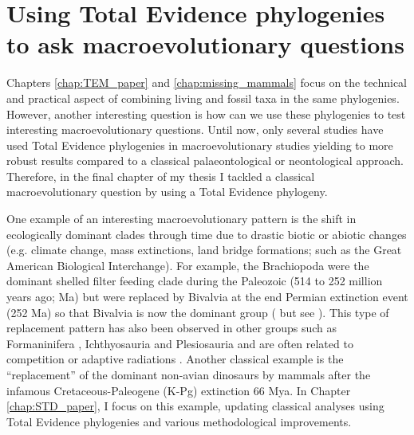 \section{Using Total Evidence phylogenies to ask macroevolutionary questions}
Chapters \ref{chap:TEM_paper} and \ref{chap:missing_mammals} focus on the technical and practical aspect of combining living and fossil taxa in the same phylogenies.
However, another interesting question is how can we use these phylogenies to test interesting macroevolutionary questions.
Until now, only several studies have used Total Evidence phylogenies in macroevolutionary studies \citep[e.g.][]{Wood01032013,slaterphylogenetic2013,beckancient2014,Dembo2015} %
yielding to more robust results compared to a classical palaeontological or neontological approach.
Therefore, in the final chapter of my thesis I tackled a classical macroevolutionary question by using a Total Evidence phylogeny. 

One example of an interesting macroevolutionary pattern is the shift in ecologically dominant clades through time due to drastic biotic or abiotic changes (e.g. climate change, mass extinctions, land bridge formations; such as the Great American Biological Interchange). %
For example, the Brachiopoda were the dominant shelled filter feeding clade during the Paleozoic (514 to 252 million years ago; Ma) but were replaced by Bivalvia at the end Permian extinction event (252 Ma) so that Bivalvia is now the dominant group (\citealt{Sepkiski1981,CLAPHAM01102006,Liow2015} but see \citealt{Payne22052014}).
This type of replacement pattern has also been observed in other groups such as Formaninifera \citep{Coxall01042006}, Ichthyosauria \citep{thorneresetting2011} and Plesiosauria \citep{bensonfaunal2014} and are often related to competition \citep{brusatte50} or adaptive radiations \citep{Losos2010}.
Another classical example is the ``replacement'' of the dominant non-avian dinosaurs by mammals after the infamous Cretaceous-Paleogene (K-Pg) extinction 66 Mya.
In Chapter \ref{chap:STD_paper}, I focus on this example, updating classical analyses using Total Evidence phylogenies and various methodological improvements.

